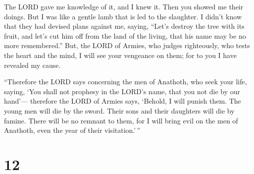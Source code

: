  The LORD gave me knowledge of it, and I knew it. Then
you showed me their doings.  But I was like a gentle lamb
that is led to the slaughter. I didn't know that they had devised plans
against me, saying, ``Let's destroy the tree with its fruit, and let's
cut him off from the land of the living, that his name may be no more
remembered.''  But, the LORD of Armies, who judges
righteously, who tests the heart and the mind, I will see your vengeance
on them; for to you I have revealed my cause.

 ``Therefore the LORD says concerning the men of
Anathoth, who seek your life, saying, `You shall not prophesy in the
LORD's name, that you not die by our hand'---  therefore
the LORD of Armies says, `Behold, I will punish them. The young men will
die by the sword. Their sons and their daughters will die by famine.
 There will be no remnant to them, for I will bring evil
on the men of Anathoth, even the year of their visitation.'\,''

\hypertarget{section-11}{%
\section{12}\label{section-11}}

